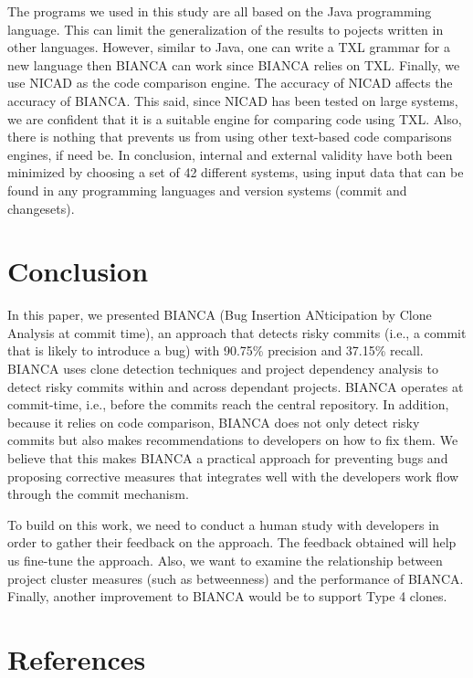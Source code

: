 \documentclass[conference]{IEEEtran}
\begin{document}
The programs we used in this study are all based on the Java programming
language. This can limit the generalization of the results to pojects
written in other languages. However, similar to Java, one can write a
TXL grammar for a new language then BIANCA can work since BIANCA relies
on TXL. Finally, we use NICAD as the code comparison engine. The
accuracy of NICAD affects the accuracy of BIANCA. This said, since NICAD
has been tested on large systems, we are confident that it is a suitable
engine for comparing code using TXL. Also, there is nothing that
prevents us from using other text-based code comparisons engines, if
need be. In conclusion, internal and external validity have both been
minimized by choosing a set of 42 different systems, using input data
that can be found in any programming languages and version systems
(commit and changesets).

\section{Conclusion}\label{sec:conclusion}

In this paper, we presented BIANCA (Bug Insertion ANticipation by Clone
Analysis at commit time), an approach that detects risky commits (i.e.,
a commit that is likely to introduce a bug) with 90.75\% precision and
37.15\% recall. BIANCA uses clone detection techniques and project
dependency analysis to detect risky commits within and across dependant
projects. BIANCA operates at commit-time, i.e., before the commits reach
the central repository. In addition, because it relies on code
comparison, BIANCA does not only detect risky commits but also makes
recommendations to developers on how to fix them. We believe that this
makes BIANCA a practical approach for preventing bugs and proposing
corrective measures that integrates well with the developers work flow
through the commit mechanism.

To build on this work, we need to conduct a human study with developers
in order to gather their feedback on the approach. The feedback obtained
will help us fine-tune the approach. Also, we want to examine the
relationship between project cluster measures (such as betweenness) and
the performance of BIANCA. Finally, another improvement to BIANCA would
be to support Type 4 clones.

\newpage

\section{References}\label{references}
\end{document}
